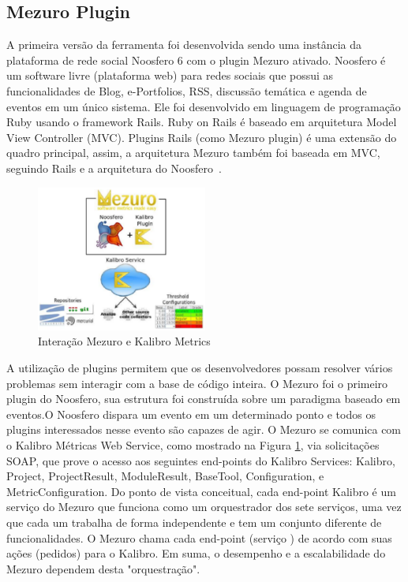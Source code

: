 \subsection{Mezuro Plugin}
\label{mezuro-plugin}
A primeira versão da ferramenta foi desenvolvida sendo uma instância da plataforma de rede social Noosfero 6 com o plugin Mezuro ativado. Noosfero é um software livre (plataforma web) para redes sociais que possui as funcionalidades de Blog, e-Portfolios, RSS, discussão temática e agenda de eventos em um único sistema. Ele foi desenvolvido em linguagem de programação Ruby usando o framework Rails. Ruby on Rails é baseado em arquitetura Model View Controller (MVC). Plugins Rails (como Mezuro plugin) é uma extensão do quadro principal, assim, a arquitetura Mezuro também foi baseada em MVC, seguindo Rails e a arquitetura do Noosfero~\cite{mezuro2012}.

\begin{figure}[H]
  \begin{center}
    \includegraphics[width=0.5\textwidth]{figuras/arquitetura.eps}
    \caption{Interação Mezuro e Kalibro Metrics}
    \label{fig:arquitetura}
  \end{center}
\end{figure}

A utilização de plugins permitem que os desenvolvedores possam resolver 
vários problemas sem interagir com a base de código inteira. O Mezuro foi 
o primeiro plugin do Noosfero, sua estrutura foi construída sobre um 
paradigma baseado em eventos.O Noosfero dispara um evento em um 
determinado ponto e todos os plugins interessados nesse evento são 
capazes de agir. O Mezuro se comunica com o Kalibro Métricas Web Service, 
como mostrado na Figura \ref{fig:arquitetura}, via solicitações SOAP, que 
prove o acesso aos seguintes end-points do Kalibro Services: Kalibro,
Project, ProjectResult, ModuleResult, BaseTool, Configuration, e 
MetricConfiguration. Do ponto de vista conceitual, cada end-point Kalibro 
é um serviço do Mezuro que funciona como um orquestrador dos sete 
serviços, uma vez que cada um trabalha de forma independente e tem um 
conjunto diferente de funcionalidades. O Mezuro chama cada end-point 
(serviço ) de acordo com suas ações (pedidos) para o Kalibro. Em suma, o 
desempenho e a escalabilidade do Mezuro dependem desta "orquestração".
~\cite{mezuro2012}

